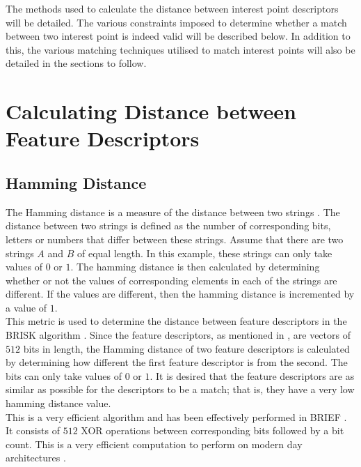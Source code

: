 \documentclass[11pt]{report}
\begin{document}
The methods used to calculate the distance between interest point descriptors will be detailed. The various constraints imposed to determine whether a match between two interest point is indeed valid will be described below. In addition to this, the various matching techniques utilised to match interest points will also be detailed in the sections to follow.\\

\section{Calculating Distance between Feature Descriptors}
\label{sec:distance}

\subsection{Hamming Distance}
\label{sec:hamming}
The Hamming distance is a measure of the distance between two strings \cite{Banzal2007}. The distance between two strings is defined as the number of corresponding bits, letters or numbers that differ between these strings. Assume that there are two strings $A$ and $B$ of equal length. In this example, these strings can only take values of $0$ or $1$. The hamming distance is then calculated by determining whether or not the values of corresponding elements in each of the strings are different. If the values are different, then the hamming distance is incremented by a value of $1$.\\

This metric is used to determine the distance between feature descriptors in the BRISK algorithm \cite{Leutenegger2011}. Since the feature descriptors, as mentioned in , are vectors of $512$ bits in length, the Hamming distance of two feature descriptors is calculated by determining how different the first feature descriptor is from the second. The bits can only take values of $0$ or $1$. It is desired that the feature descriptors are as similar as possible for the descriptors to be a match; that is, they have a very low hamming distance value. \\

This is a very efficient algorithm and has been effectively performed in BRIEF \cite{Calonder}. It consists of $512$ XOR operations between corresponding bits followed by a bit count. This is a very efficient computation to perform on modern day architectures \cite{Leutenegger2011}. \\ 
\end{document}

